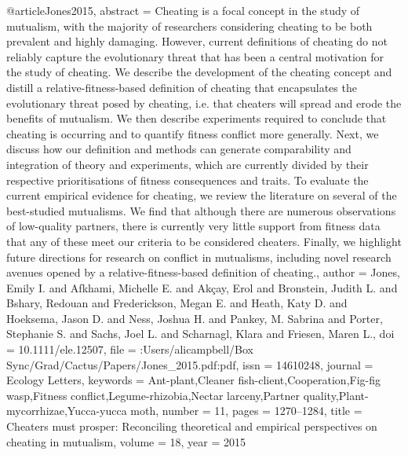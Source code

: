 @article{Jones2015,
abstract = {Cheating is a focal concept in the study of mutualism, with the majority of researchers considering cheating to be both prevalent and highly damaging. However, current definitions of cheating do not reliably capture the evolutionary threat that has been a central motivation for the study of cheating. We describe the development of the cheating concept and distill a relative-fitness-based definition of cheating that encapsulates the evolutionary threat posed by cheating, i.e. that cheaters will spread and erode the benefits of mutualism. We then describe experiments required to conclude that cheating is occurring and to quantify fitness conflict more generally. Next, we discuss how our definition and methods can generate comparability and integration of theory and experiments, which are currently divided by their respective prioritisations of fitness consequences and traits. To evaluate the current empirical evidence for cheating, we review the literature on several of the best-studied mutualisms. We find that although there are numerous observations of low-quality partners, there is currently very little support from fitness data that any of these meet our criteria to be considered cheaters. Finally, we highlight future directions for research on conflict in mutualisms, including novel research avenues opened by a relative-fitness-based definition of cheating.},
author = {Jones, Emily I. and Afkhami, Michelle E. and Ak{\c{c}}ay, Erol and Bronstein, Judith L. and Bshary, Redouan and Frederickson, Megan E. and Heath, Katy D. and Hoeksema, Jason D. and Ness, Joshua H. and Pankey, M. Sabrina and Porter, Stephanie S. and Sachs, Joel L. and Scharnagl, Klara and Friesen, Maren L.},
doi = {10.1111/ele.12507},
file = {:Users/alicampbell/Box Sync/Grad/Cactus/Papers/Jones_2015.pdf:pdf},
issn = {14610248},
journal = {Ecology Letters},
keywords = {Ant-plant,Cleaner fish-client,Cooperation,Fig-fig wasp,Fitness conflict,Legume-rhizobia,Nectar larceny,Partner quality,Plant-mycorrhizae,Yucca-yucca moth},
number = {11},
pages = {1270--1284},
title = {{Cheaters must prosper: Reconciling theoretical and empirical perspectives on cheating in mutualism}},
volume = {18},
year = {2015}
}
